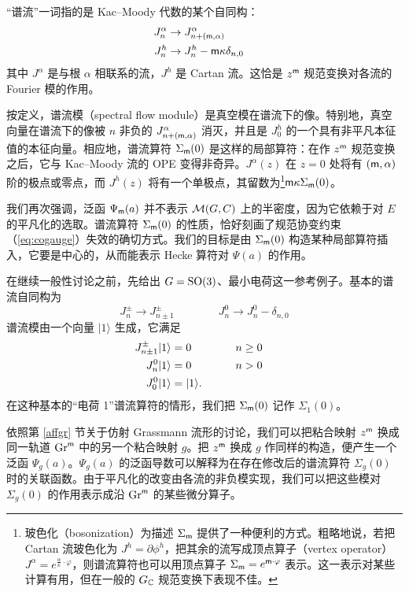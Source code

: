 “谱流”一词指的是 Kac--Moody 代数的某个自同构：
\begin{align}
J^\alpha_n &\to J^{\alpha}_{n+({\sf m}, \alpha)} \cr
J^h_n &\to J^h_n - {\sf m} \kappa \delta_{n,0}
\end{align}
其中 $J^\alpha$ 是与根 $\alpha$ 相联系的流，$J^h$ 是 Cartan 流。这恰是 $z^{\sf m}$ 规范变换对各流的 Fourier 模的作用。

按定义，谱流模（spectral flow module）是真空模在谱流下的像。特别地，真空向量在谱流下的像被 $n$ 非负的 $J^{\alpha}_{n+({\sf m}, \alpha)}$ 消灭，并且是 $J^h_0$ 的一个具有非平凡本征值的本征向量。相应地，谱流算符 $\Sigma_{{\sf m}}(0)$ 是这样的局部算符：在作 $z^{\sf m}$ 规范变换之后，它与 Kac--Moody 流的 OPE 变得非奇异。$J^{\alpha}(z)$ 在 $z=0$ 处将有 $({\sf m}, \alpha)$ 阶的极点或零点，而 $J^h(z)$ 将有一个单极点，其留数为\footnote{玻色化（bosonization）为描述 $\Sigma_{{\sf m}}$ 提供了一种便利的方式。粗略地说，若把 Cartan 流玻色化为 $J^h = \partial \phi^h$，把其余的流写成顶点算子（vertex operator）$J^\alpha = e^{\frac{\alpha}{\kappa} \cdot \varphi}$，则谱流算符也可以用顶点算子 $\Sigma_{{\sf m}} = e^{{\sf m} \cdot \varphi}$ 表示。这一表示对某些计算有用，但在一般的 $G_{\mathbb C}$ 规范变换下表现不佳。}${\sf m}\kappa \Sigma_{{\sf m}}(0)$。

我们再次强调，泛函 $\Psi_{{\sf m}}(a)$ 并不表示 ${\mathcal M}(G,C)$ 上的半密度，因为它依赖于对 $E$ 的平凡化的选取。谱流算符 $\Sigma_{{\sf m}}(0)$ 的性质，恰好刻画了规范协变约束（\ref{eq:cogauge}）失效的确切方式。我们的目标是由 $\Sigma_{{\sf m}}(0)$ 构造某种局部算符插入，它要是中心的，从而能表示 Hecke 算符对 $\Psi(a)$ 的作用。

在继续一般性讨论之前，先给出 $G={\mathrm{SO}}(3)$、最小电荷这一参考例子。基本的谱流自同构为
\begin{equation}
J^\pm_n \to J^{\pm}_{n \pm 1} \qquad \qquad J^0_n \to J^0_n - \delta_{n,0}
\end{equation}
谱流模由一个向量 $|1\rangle$ 生成，它满足
\begin{align}\label{laterref}
J^{\pm}_{n \pm 1} |1\rangle &=0  \qquad \qquad n\geq 0 \cr
J^0_n |1\rangle &=0  \qquad \qquad n> 0 \cr
J^0_0|1\rangle &= |1\rangle.
\end{align}
在这种基本的“电荷 1”谱流算符的情形，我们把 $\Sigma_{\sf m}(0)$ 记作 $\Sigma_1(0)$。

依照第 \ref{affgr} 节关于仿射 Grassmann 流形的讨论，我们可以把粘合映射 $z^{\sf m}$ 换成同一轨道 ${\mathrm{Gr}}^{\sf m}$ 中的另一个粘合映射 $g$。把 $z^{\sf m}$ 换成 $g$ 作同样的构造，便产生一个泛函 $\Psi_{g}(a)$。$\Psi_{g}(a)$ 的泛函导数可以解释为在存在修改后的谱流算符 $\Sigma_{g}(0)$ 时的关联函数。由于平凡化的改变由各流的非负模实现，我们可以把这些模对 $\Sigma_{g}(0)$ 的作用表示成沿 ${\mathrm{Gr}}^{\sf m}$ 的某些微分算子。


